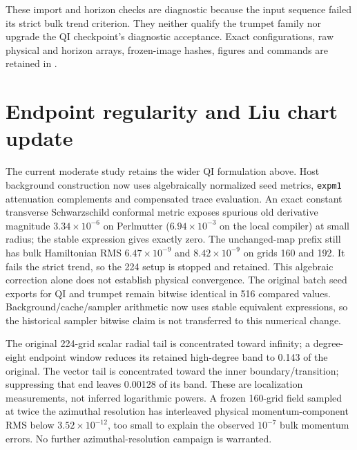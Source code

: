 \documentclass[aps,prd,preprint,notitlepage,nofootinbib]{revtex4-2}
\begin{document}
These import and horizon checks are diagnostic because the input sequence
failed its strict bulk trend criterion. They neither qualify the trumpet
family nor upgrade the QI checkpoint's diagnostic acceptance. Exact
configurations, raw physical and horizon arrays, frozen-image hashes, figures
and commands are retained in
.

\section{Endpoint regularity and Liu chart update}
The current moderate study retains the wider QI formulation above. Host
background construction now uses algebraically normalized seed metrics,
\texttt{expm1} attenuation complements and compensated trace evaluation.
An exact constant transverse Schwarzschild conformal metric exposes spurious
old derivative magnitude $3.34\times10^{-6}$ on Perlmutter ($6.94\times10^{-3}$
on the local compiler) at small radius; the stable
expression gives exactly zero. The unchanged-map prefix still has bulk
Hamiltonian RMS $6.47\times10^{-9}$ and $8.42\times10^{-9}$ on grids 160 and
192. It fails the strict trend, so the 224 setup is stopped and retained.
This algebraic correction alone does not establish physical convergence.
The original batch seed exports for QI and trumpet remain bitwise identical
in 516 compared values. Background/cache/sampler arithmetic now uses stable
equivalent expressions, so the historical sampler bitwise claim is not
transferred to this numerical change.

The original 224-grid scalar radial tail is concentrated toward infinity;
a degree-eight endpoint window reduces its retained high-degree band to
0.143 of the original. The vector tail is concentrated toward the inner
boundary/transition; suppressing that end leaves 0.00128 of its band.
These are localization measurements, not inferred logarithmic powers.
A frozen 160-grid field sampled at twice the azimuthal resolution has
interleaved physical momentum-component RMS below $3.52\times10^{-12}$,
too small to explain the observed $10^{-7}$ bulk momentum errors.
No further azimuthal-resolution campaign is warranted.
\end{document}
